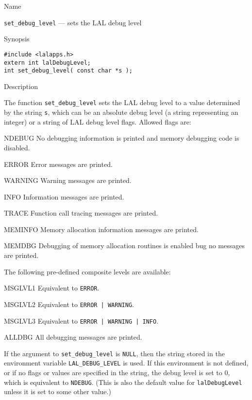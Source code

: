 \documentclass[oneside]{book}
\newenvironment{entry}%
  {\begin{list}{}{\renewcommand{\makelabel}[1]%
    {\parbox[b]{\labelwidth}{\makebox[0pt][l]{\textbf{##1}}\\}}%
    \setlength{\labelwidth}{1em}%
    \setlength{\labelsep}{1em}%
    \setlength{\leftmargin}{2em}%
    \setlength{\topsep}{\medskipamount}%
    \setlength{\itemsep}{\medskipamount}%
    \setlength{\parsep}{\medskipamount}%
    \setlength{\listparindent}{0pt}}}
  {\end{list}}
\newenvironment{indented}%
  {\begin{list}{}{\setlength{\leftmargin}{2em}}%
    \setlength{\itemsep}{\medskipamount}%
    \setlength{\parsep}{\medskipamount}%
    \setlength{\listparindent}{0pt}\item}
  {\end{list}}
\begin{document}
\begin{entry}

\item[Name]

\verb$set_debug_level$ --- sets the LAL debug level

\item[Synopsis]

\begin{verbatim}
#include <lalapps.h>
extern int lalDebugLevel;
int set_debug_level( const char *s );
\end{verbatim}

\item[Description]

The function \verb$set_debug_level$ sets the LAL debug level to a value
determined by the string \verb$s$, which can be an absolute debug level
(a string representing an integer) or a string of LAL debug level flags.
Allowed flags are:
\begin{indented}
\begin{entry}
\item[NDEBUG]
  No debugging information is printed and memory debugging code is disabled.
\item[ERROR]
  Error messages are printed.
\item[WARNING]
  Warning messages are printed.
\item[INFO]
  Information messages are printed.
\item[TRACE]
  Function call tracing messages are printed.
\item[MEMINFO]
  Memory allocation information messages are printed.
\item[MEMDBG]
  Debugging of memory allocation routines is enabled bug no messages are
  printed.
\end{entry}
\end{indented}
The following pre-defined composite levels are available:
\begin{indented}
\begin{entry}
\item[MSGLVL1]
  Equivalent to \verb$ERROR$.
\item[MSGLVL2]
  Equivalent to \verb$ERROR | WARNING$.
\item[MSGLVL3]
  Equivalent to \verb$ERROR | WARNING | INFO$.
\item[ALLDBG]
  All debugging messages are printed.
\end{entry}
\end{indented}

If the argument to \verb$set_debug_level$ is \verb$NULL$, then the string
stored in the environment variable \verb$LAL_DEBUG_LEVEL$ is used.  If this
environment is not defined, or if no flags or values are specified in the
string, the debug level is set to 0, which is equivalent to \verb$NDEBUG$.
(This is also the default value for \verb$lalDebugLevel$ unless it is set to
some other value.)


\end{entry}
\end{document}
